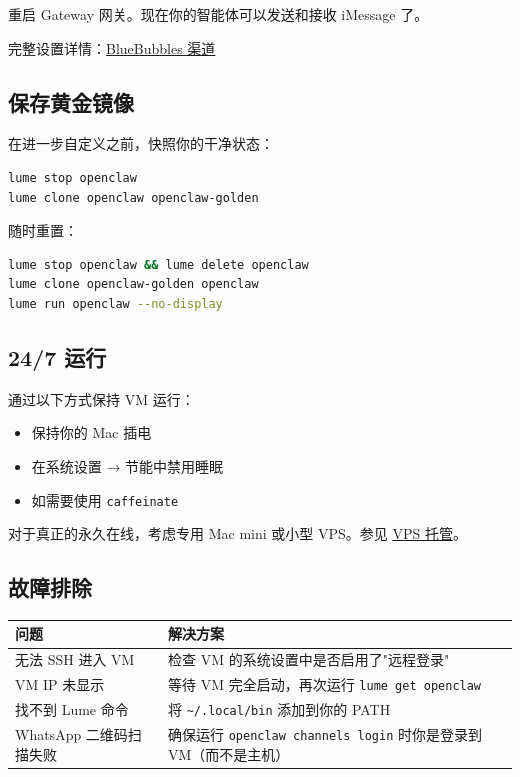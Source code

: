 重启 Gateway 网关。现在你的智能体可以发送和接收 iMessage 了。

完整设置详情：\href{/channels/bluebubbles}{BlueBubbles 渠道}

\hrulefill


\subsection{保存黄金镜像}


在进一步自定义之前，快照你的干净状态：

\begin{lstlisting}[language=bash]
lume stop openclaw
lume clone openclaw openclaw-golden
\end{lstlisting}


随时重置：

\begin{lstlisting}[language=bash]
lume stop openclaw && lume delete openclaw
lume clone openclaw-golden openclaw
lume run openclaw --no-display
\end{lstlisting}


\hrulefill


\subsection{24/7 运行}


通过以下方式保持 VM 运行：

\begin{itemize}
  \item 保持你的 Mac 插电
  \item 在系统设置 → 节能中禁用睡眠
  \item 如需要使用 \texttt{caffeinate}
\end{itemize}


对于真正的永久在线，考虑专用 Mac mini 或小型 VPS。参见 \href{/vps}{VPS 托管}。

\hrulefill


\subsection{故障排除}



\begin{table}[h]
\centering
\small
\begin{tabular}{|l|l|}
\hline
问题 & 解决方案 \\
\hline
无法 SSH 进入 VM & 检查 VM 的系统设置中是否启用了"远程登录" \\
\hline
VM IP 未显示 & 等待 VM 完全启动，再次运行 \texttt{lume get openclaw} \\
\hline
找不到 Lume 命令 & 将 \texttt{\textasciitilde{}/.local/bin} 添加到你的 PATH \\
\hline
WhatsApp 二维码扫描失败 & 确保运行 \texttt{openclaw channels login} 时你是登录到 VM（而不是主机） \\
\hline
\end{tabular}
\end{table}




